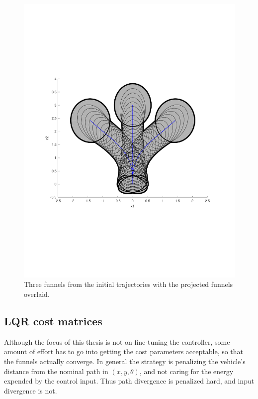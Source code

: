\begin{figure}
  \centering
  \includegraphics[scale=.5]{figures/experiments/sample-funnel-overlay}
  \caption{Three funnels from the initial trajectories with the projected
    funnels overlaid.}
  \label{fig:sample-funnel-overlay}
\end{figure}

\subsection{LQR cost matrices}

Although the focus of this thesis is not on fine-tuning the controller, some
amount of effort has to go into getting the cost parameters acceptable, so that
the funnels actually converge. In general the strategy is penalizing the
vehicle's distance from the nominal path in \((x,y,\theta)\), and not caring for
the energy expended by the control input. Thus path divergence is penalized
hard, and input divergence is not.

